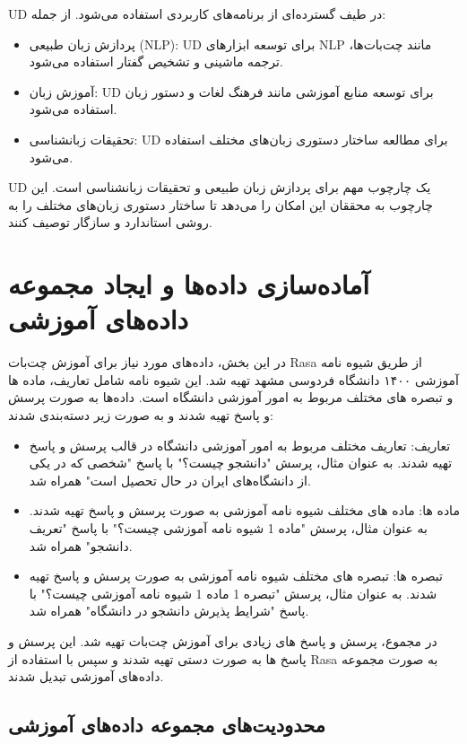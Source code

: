 UD در طیف گسترده‌ای از برنامه‌های کاربردی استفاده می‌شود. از جمله:

\begin{itemize}
\item پردازش زبان طبیعی (NLP): UD برای توسعه ابزارهای NLP مانند چت‌بات‌ها، ترجمه ماشینی و تشخیص گفتار استفاده می‌شود.
\item آموزش زبان: UD برای توسعه منابع آموزشی مانند فرهنگ لغات و دستور زبان استفاده می‌شود.
\item تحقیقات زبانشناسی: UD برای مطالعه ساختار دستوری زبان‌های مختلف استفاده می‌شود.
\end{itemize}

UD یک چارچوب مهم برای پردازش زبان طبیعی و تحقیقات زبانشناسی است. این چارچوب به محققان این امکان را می‌دهد تا ساختار دستوری زبان‌های مختلف را به روشی استاندارد و سازگار توصیف کنند.


\section{آماده‌سازی داده‌ها و ایجاد مجموعه داده‌های آموزشی}


در این بخش، داده‌های مورد نیاز برای آموزش چت‌بات Rasa از طریق شیوه نامه آموزشی ۱۴۰۰ دانشگاه فردوسی مشهد تهیه شد. این شیوه نامه شامل تعاریف، ماده ها و تبصره های مختلف مربوط به امور آموزشی دانشگاه است. داده‌ها به صورت پرسش و پاسخ تهیه شدند و به صورت زیر دسته‌بندی شدند:

\begin{itemize}
    \item تعاریف: تعاریف مختلف مربوط به امور آموزشی دانشگاه در قالب پرسش و پاسخ تهیه شدند. به عنوان مثال، پرسش "دانشجو چیست؟" با پاسخ "شخصی که در یکی از دانشگاه‌های ایران در حال تحصیل است" همراه شد.
    \item ماده ها: ماده های مختلف شیوه نامه آموزشی به صورت پرسش و پاسخ تهیه شدند. به عنوان مثال، پرسش "ماده 1 شیوه نامه آموزشی چیست؟" با پاسخ "تعریف دانشجو" همراه شد.
    \item تبصره ها: تبصره های مختلف شیوه نامه آموزشی به صورت پرسش و پاسخ تهیه شدند. به عنوان مثال، پرسش "تبصره 1 ماده 1 شیوه نامه آموزشی چیست؟" با پاسخ "شرایط پذیرش دانشجو در دانشگاه" همراه شد.
\end{itemize}

در مجموع، پرسش و پاسخ های زیادی برای آموزش چت‌بات تهیه شد. این پرسش و پاسخ ها به صورت دستی تهیه شدند و سپس با استفاده از Rasa به صورت مجموعه داده‌های آموزشی تبدیل شدند.

\subsection{محدودیت‌های مجموعه داده‌های آموزشی}


